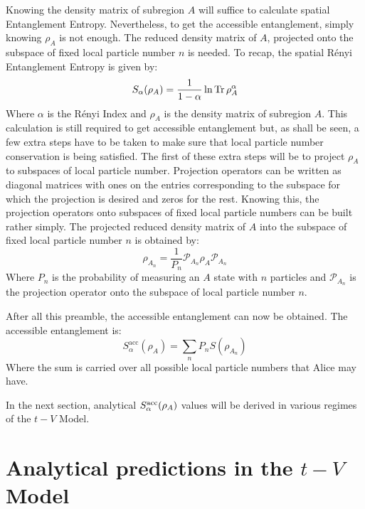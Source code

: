 	Knowing the density matrix of subregion $A$ will suffice to calculate spatial Entanglement Entropy. Nevertheless, to get the accessible entanglement, simply knowing $\rho_{A}$ is not enough. The reduced density matrix of $A$, projected onto the subspace of fixed local particle number $n$ is needed. To recap, the spatial R\'enyi Entanglement Entropy is given by:
%	
\begin{equation}
 S_{\alpha}(\rho_{A}) = \frac{1}{1-\alpha} \ln{\operatorname{Tr}{\rho_{A}^{\alpha}}} 
\end{equation}
%
Where $\alpha$ is the R\'enyi Index and $\rho_{A}$ is the density matrix of subregion $A$. This calculation is still required to get accessible entanglement but, as shall be seen, a few extra steps have to be taken to make sure that local particle number conservation is being satisfied. The first of these extra steps will be to project $\rho_{A}$ to subspaces of local particle number. Projection operators can be written as diagonal matrices with ones on the entries corresponding to the subspace for which the projection is desired and zeros for the rest. Knowing this, the projection operators onto subspaces of fixed local particle numbers can be built rather simply. The projected reduced density matrix of  $A$ into the subspace of fixed local particle number $n$ is obtained by:
%
\begin{equation}
\rho_{A_n} = \frac{1}{P_n} \mathcal{P}_{A_n} \rho_A \mathcal{P}_{A_n}
\label{eq:accessibleEE}
\end{equation}
%
Where $P_n$ is the probability of measuring an $A$ state with $n$ particles and $\mathcal{P}_{A_n}$ is the projection operator onto the subspace of local particle number $n$.

After all this preamble, the accessible entanglement can now be obtained. The accessible entanglement is:
%
\begin{equation}
S_{\alpha}^{\mathrm{acc}}(\rho_A) = \sum_{n} P_n S(\rho_{A_n}) 
\label{eq:accessibleEE}
\end{equation}
%
Where the sum is carried over all possible local particle numbers that Alice may have.

In the next section, analytical $S_{\alpha}^{\rm acc}(\rho_A)$ values will be derived in various regimes of the $t-V$ Model.

\section{Analytical predictions in the $t-V$ Model}

